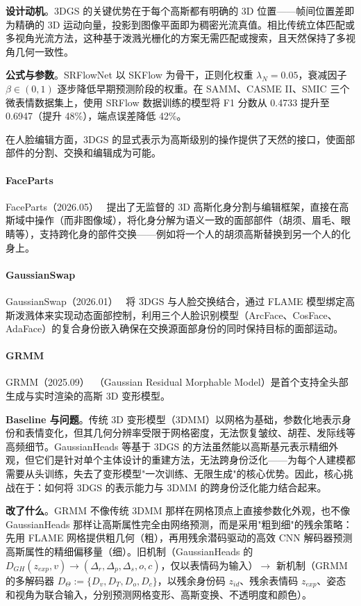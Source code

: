 \textbf{设计动机}。3DGS 的关键优势在于每个高斯都有明确的 3D 位置——帧间位置差即为精确的 3D 运动向量，投影到图像平面即为稠密光流真值。相比传统立体匹配或多视角光流方法，这种基于泼溅光栅化的方案无需匹配或搜索，且天然保持了多视角几何一致性。

\textbf{公式与参数}。SRFlowNet 以 SKFlow 为骨干，正则化权重 $\lambda_N = 0.05$，衰减因子 $\beta \in (0,1)$ 逐步降低早期预测阶段的权重。在 SAMM、CASME II、SMIC 三个微表情数据集上，使用 SRFlow 数据训练的模型将 F1 分数从 0.4733 提升至 0.6947（提升 48\%），端点误差降低 42\%。

在人脸编辑方面，3DGS 的显式表示为高斯级别的操作提供了天然的接口，使面部部件的分割、交换和编辑成为可能。

\paragraph{FaceParts}

FaceParts（2026.05）~\cite{2605_13853} 提出了无监督的 3D 高斯化身分割与编辑框架，直接在高斯域中操作（而非图像域），将化身分解为语义一致的面部部件（胡须、眉毛、眼睛等），支持跨化身的部件交换——例如将一个人的胡须高斯替换到另一个人的化身上。

\paragraph{GaussianSwap}

GaussianSwap（2026.01）~\cite{2601_05511} 将 3DGS 与人脸交换结合，通过 FLAME 模型绑定高斯泼溅体来实现动态面部控制，利用三个人脸识别模型（ArcFace、CosFace、AdaFace）的复合身份嵌入确保在交换源面部身份的同时保持目标的面部运动。

\paragraph{GRMM}

GRMM（2025.09）~\cite{2509_02141}（Gaussian Residual Morphable Model）是首个支持全头部生成与实时渲染的高斯 3D 变形模型。

\textbf{Baseline 与问题}。传统 3D 变形模型（3DMM）以网格为基础，参数化地表示身份和表情变化，但其几何分辨率受限于网格密度，无法恢复皱纹、胡茬、发际线等高频细节。GaussianHeads 等基于 3DGS 的方法虽然能以高斯基元表示精细外观，但它们是针对单个主体设计的重建方法，无法跨身份泛化——为每个人建模都需要从头训练，失去了变形模型"一次训练、无限生成"的核心优势。因此，核心挑战在于：如何将 3DGS 的表示能力与 3DMM 的跨身份泛化能力结合起来。

\textbf{改了什么}。GRMM 不像传统 3DMM 那样在网格顶点上直接参数化外观，也不像 GaussianHeads 那样让高斯属性完全由网络预测，而是采用"粗到细"的残余策略：先用 FLAME 网格提供粗几何（粗），再用残余潜码驱动的高效 CNN 解码器预测高斯属性的精细偏移量（细）。旧机制（GaussianHeads 的 $D_{GH}(z_{exp}, v) \to (\Delta_r, \Delta_p, \Delta_s, o, c)$，仅以表情码为输入）$\to$ 新机制（GRMM 的多解码器 $D_{\Theta} := \{D_v, D_T, D_o, D_c\}$，以残余身份码 $z_{id}$、残余表情码 $z_{exp}$、姿态和视角为联合输入，分别预测网格变形、高斯变换、不透明度和颜色）。

